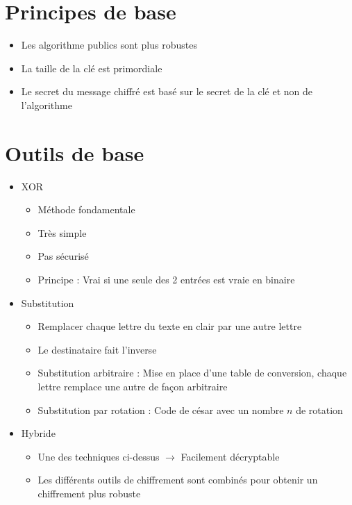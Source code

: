 \documentclass[a4paper]{article}
\begin{document}
\section{Principes de base}
\begin{itemize}[label=\textbullet, font=\Large]
    \item Les algorithme publics sont plus robustes
    \item La taille de la clé est primordiale
    \item Le secret du message chiffré est basé sur le secret de la clé et non de l’algorithme
\end{itemize}

\section{Outils de base}
\begin{itemize}[label=\textbullet, font=\Large]
    \item XOR 
    \begin{itemize}[label=, font=\scriptsize]
        \item Méthode fondamentale
        \item Très simple
        \item Pas sécurisé
        \item Principe : Vrai si une seule des 2 entrées est vraie en binaire
    \end{itemize}
    \item Substitution
    \begin{itemize}[label=, font=\scriptsize]
        \item Remplacer chaque lettre du texte en clair par une autre lettre
        \item Le destinataire fait l'inverse
        \item Substitution arbitraire : Mise en place d'une table de conversion, chaque lettre remplace une autre de façon arbitraire
        \item Substitution par rotation : Code de césar avec un nombre $n$ de rotation
    \end{itemize}
    \item Hybride
    \begin{itemize}[label=, font=\scriptsize]
        \item Une des techniques ci-dessus $\rightarrow$ Facilement décryptable
        \item Les différents outils de chiffrement sont combinés pour obtenir un chiffrement plus robuste
    \end{itemize}
\end{itemize}
\end{document}
